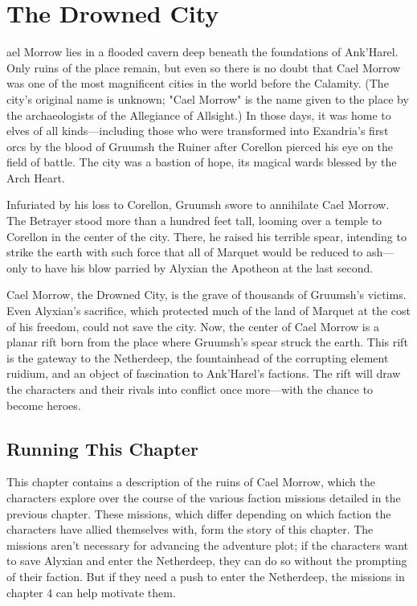 \documentclass[10pt,a4paper,twoside,bg=print,twocolumn,openany,nodeprecatedcode]{dndbook}
\begin{document}
\chapter{The Drowned City}
ael Morrow lies in a flooded cavern deep beneath the foundations of Ank'Harel. Only ruins of the place remain, but even so there is no doubt that Cael Morrow was one of the most magnificent cities in the world before the Calamity. (The city's original name is unknown; "Cael Morrow" is the name given to the place by the archaeologists of the Allegiance of Allsight.) In those days, it was home to elves of all kinds—including those who were transformed into Exandria's first orcs by the blood of Gruumsh the Ruiner after Corellon pierced his eye on the field of battle. The city was a bastion of hope, its magical wards blessed by the Arch Heart.


Infuriated by his loss to Corellon, Gruumsh swore to annihilate Cael Morrow. The Betrayer stood more than a hundred feet tall, looming over a temple to Corellon in the center of the city. There, he raised his terrible spear, intending to strike the earth with such force that all of Marquet would be reduced to ash—only to have his blow parried by Alyxian the Apotheon at the last second.

Cael Morrow, the Drowned City, is the grave of thousands of Gruumsh's victims. Even Alyxian's sacrifice, which protected much of the land of Marquet at the cost of his freedom, could not save the city. Now, the center of Cael Morrow is a planar rift born from the place where Gruumsh's spear struck the earth. This rift is the gateway to the Netherdeep, the fountainhead of the corrupting element ruidium, and an object of fascination to Ank'Harel's factions. The rift will draw the characters and their rivals into conflict once more—with the chance to become heroes.

\section{Running This Chapter}
This chapter contains a description of the ruins of Cael Morrow, which the characters explore over the course of the various faction missions detailed in the previous chapter. These missions, which differ depending on which faction the characters have allied themselves with, form the story of this chapter. The missions aren't necessary for advancing the adventure plot; if the characters want to save Alyxian and enter the Netherdeep, they can do so without the prompting of their faction. But if they need a push to enter the Netherdeep, the missions in chapter 4 can help motivate them.
\end{document}
